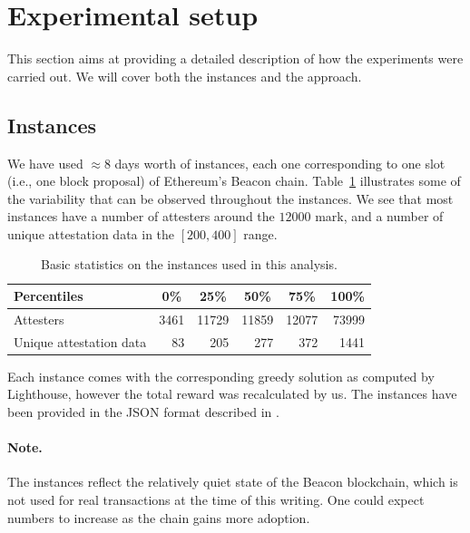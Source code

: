 \documentclass{article}
\begin{document}
\section{Experimental setup} \label{sec:setup}

This section aims at providing a detailed description of how the experiments
were carried out. We will cover both the instances and the approach.

\subsection{Instances}

We have used $\approx 8$ days worth of instances, each one corresponding to one slot (i.e., one
block proposal) of Ethereum's Beacon chain. Table~\ref{tab:insta} illustrates
some of the variability that can be observed throughout the instances. We
see that most instances have a number of attesters around the $12000$ mark,
and a number of unique attestation data in the $\left[200,400\right]$ range.

\begin{table}[h!]
  \centering
    \begin{tabular}{lrrrrr}
    \hline
    \textbf{Percentiles}    & \multicolumn{1}{c}{\textbf{0\%}} & \multicolumn{1}{c}{\textbf{25\%}} & \multicolumn{1}{c}{\textbf{50\%}} & \multicolumn{1}{c}{\textbf{75\%}} & \multicolumn{1}{c}{\textbf{100\%}} \\ \hline
    Attesters               & 3461                             & 11729                             & 11859                             & 12077                             & 73999                              \\
    Unique attestation data & 83                               & 205                               & 277                               & 372                               & 1441                               \\ \hline
    \end{tabular}
  \caption{Basic statistics on the instances used in this analysis.\label{tab:insta}}
\end{table}

Each instance comes with the corresponding greedy solution as computed by
Lighthouse, however the total reward was recalculated by us.  The instances
have been provided in the JSON format described in \cite{Satalia22a}.

\paragraph{Note.} The instances reflect the relatively quiet state of the
Beacon blockchain, which is not used for real transactions at the time of this
writing. One could expect numbers to increase as the chain gains more adoption.
\end{document}
